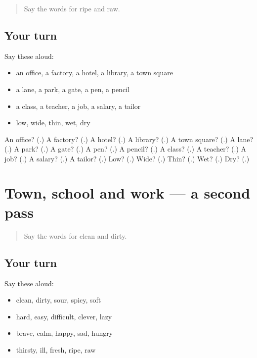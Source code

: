 \begin{quote}
Say the words for ripe and raw.
\end{quote}

\subsection*{Your turn}
Say these aloud:

\begin{itemize}
\raggedright
  \item an office, a factory, a hotel, a library, a town square
  \item a lane, a park, a gate, a pen, a pencil
  \item a class, a teacher, a job, a salary, a tailor
  \item low, wide, thin, wet, dry
\end{itemize}

\begin{tcolorbox}[breakable,colback=teal!4,colframe=teal!35!black,title={Before you move on}]
An office? (\textbf{}.) A factory? (\textbf{}.) A hotel? (\textbf{}.) A library? (\textbf{}.) A town square? (\textbf{}.) A lane? (\textbf{}.) A park? (\textbf{}.) A gate? (\textbf{}.) A pen? (\textbf{}.) A pencil? (\textbf{}.) A class? (\textbf{}.) A teacher? (\textbf{}.) A job? (\textbf{}.) A salary? (\textbf{}.) A tailor? (\textbf{}.) Low? (\textbf{}.) Wide? (\textbf{}.) Thin? (\textbf{}.) Wet? (\textbf{}.) Dry? (\textbf{}.)
\end{tcolorbox}
\section[(dialogue)]{Town, school and work — a second pass}

\label{lesson:GU-R135-second-pass-town-school-and-work}



\begin{quote}
Say the words for clean and dirty.
\end{quote}

\subsection*{Your turn}
Say these aloud:

\begin{itemize}
\raggedright
  \item clean, dirty, sour, spicy, soft
  \item hard, easy, difficult, clever, lazy
  \item brave, calm, happy, sad, hungry
  \item thirsty, ill, fresh, ripe, raw
\end{itemize}

